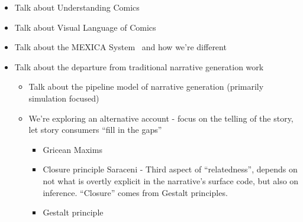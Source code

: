 \begin{itemize}

	\item Talk about Understanding Comics~\cite{mcCloud1993understanding}
	\item Talk about Visual Language of Comics~\cite{cohn2013visual}
	\item Talk about the MEXICA System~\cite{perez2001mexica} and how we're different
	\item Talk about the departure from traditional narrative generation work
	\begin{itemize}
		\item Talk about the pipeline model of narrative generation (primarily 
		simulation focused)
		\item We're exploring an alternative account - 
		focus on the telling of the story, let story consumers ``fill in the gaps''
		
		\begin{itemize}
			\item Gricean Maxims
			\item Closure principle Saraceni - Third aspect of ``relatedness'', 
			depends on not what is overtly explicit in the narrative's surface 
			code, but also on inference.  ``Closure'' comes from Gestalt principles.
			\item Gestalt principle 
	\end{itemize}
	\end{itemize}

\end{itemize}




